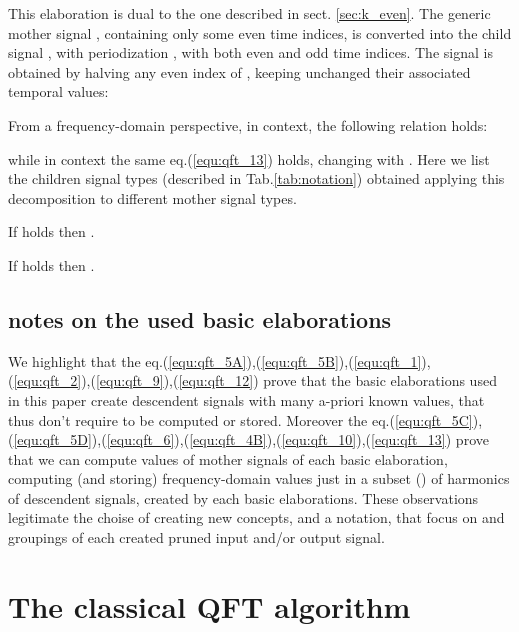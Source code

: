 \documentclass[a4paper,10pt]{article}
\begin{document}
This elaboration is dual to the one described in sect. \ref{sec:k_even}.
The generic mother signal , containing only some even time indices, is converted into the child signal , with periodization , with both even and odd time indices.
The signal  is obtained by halving any even  index of , keeping unchanged their associated temporal values:

From a frequency-domain perspective, in  context, the following relation holds:

while in  context the same eq.(\ref{equ:qft_13}) holds, changing  with . 
Here we list the children signal types (described in Tab.\ref{tab:notation}) obtained applying this decomposition to different mother signal types.

If  holds then .

If  holds then .








\subsection{notes on the used basic elaborations} 

We highlight that the eq.(\ref{equ:qft_5A}),(\ref{equ:qft_5B}),(\ref{equ:qft_1}),(\ref{equ:qft_2}),(\ref{equ:qft_9}),(\ref{equ:qft_12}) prove that the basic elaborations used in this paper create descendent signals with many a-priori known  values, that thus don't require to be computed or stored.
Moreover the eq.(\ref{equ:qft_5C}),(\ref{equ:qft_5D}),(\ref{equ:qft_6}),(\ref{equ:qft_4B}),(\ref{equ:qft_10}),(\ref{equ:qft_13}) prove that we can compute  values of mother signals of each basic elaboration, computing (and storing) frequency-domain values just in a subset () of harmonics of descendent signals, created by each basic elaborations.
These observations legitimate the choise of creating new concepts, and a notation, that focus on  and  groupings of each created pruned input and/or output signal.










\section{The classical QFT algorithm} \label{sec:la_QFT_classica}
\end{document}

